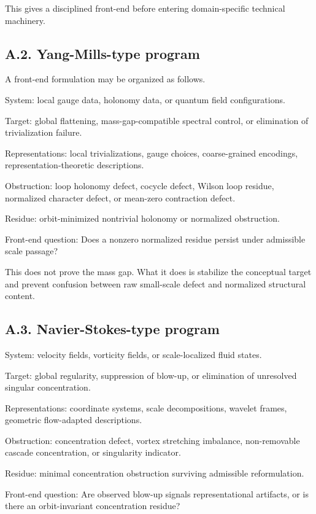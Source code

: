 \documentclass[
]{article}
\begin{document}
This gives a disciplined front-end before entering domain-specific
technical machinery.

\subsection{A.2. Yang-Mills-type
program}\label{a.2.-yang-mills-type-program}

A front-end formulation may be organized as follows.

System: local gauge data, holonomy data, or quantum field
configurations.

Target: global flattening, mass-gap-compatible spectral control, or
elimination of trivialization failure.

Representations: local trivializations, gauge choices, coarse-grained
encodings, representation-theoretic descriptions.

Obstruction: loop holonomy defect, cocycle defect, Wilson loop residue,
normalized character defect, or mean-zero contraction defect.

Residue: orbit-minimized nontrivial holonomy or normalized obstruction.

Front-end question: Does a nonzero normalized residue persist under
admissible scale passage?

This does not prove the mass gap. What it does is stabilize the
conceptual target and prevent confusion between raw small-scale defect
and normalized structural content.

\subsection{A.3. Navier-Stokes-type
program}\label{a.3.-navier-stokes-type-program}

System: velocity fields, vorticity fields, or scale-localized fluid
states.

Target: global regularity, suppression of blow-up, or elimination of
unresolved singular concentration.

Representations: coordinate systems, scale decompositions, wavelet
frames, geometric flow-adapted descriptions.

Obstruction: concentration defect, vortex stretching imbalance,
non-removable cascade concentration, or singularity indicator.

Residue: minimal concentration obstruction surviving admissible
reformulation.

Front-end question: Are observed blow-up signals representational
artifacts, or is there an orbit-invariant concentration residue?
\end{document}
